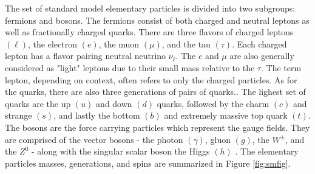 The set of standard model elementary particles is divided into two subgroups: fermions and bosons.  The fermions consist of both charged and neutral leptons as well as fractionally charged quarks. There are three flavors of charged leptons $(\ell)$, the electron $(e)$, the muon $(\mu)$, and the tau $(\tau)$. Each charged lepton has a flavor pairing neutral neutrino $\nu_\ell$. The $e$ and $\mu$ are also generally considered as "light" leptons due to their small mass relative to the $\tau$. The term lepton, depending on context, often refers to only the charged particles. As for the quarks, there are also three generations of pairs of quarks.. The lighest set of quarks are the up $(u)$ and down $(d)$ quarks, followed by the charm $(c)$ and strange $(s)$, and lastly the bottom $(b)$ and extremely massive top quark $(t)$.  The bosons are the force carrying particles which represent the gauge fields. They are comprised of the vector bosons - the photon $(\gamma)$, gluon $(g)$, the $W^\pm$, and the $Z^0$ - along with the singular scalar boson the Higgs $(h)$ \cite{ParticleDataGroup:2020ssz}. The elementary particles masses, generations, and spins are summarized in Figure \ref{fig:smfig}.






